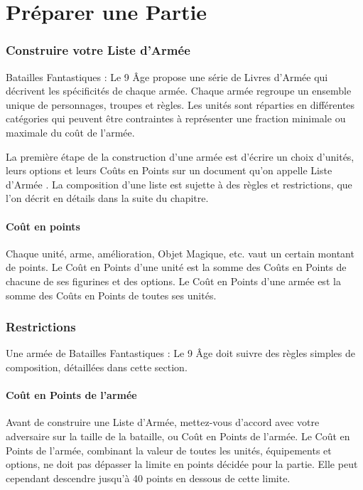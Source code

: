 
\part{Préparer une Partie}

\section{Construire votre Liste d'Armée}
\label{building_an_army}

Batailles Fantastiques : Le 9\ieme{} Âge propose une série de Livres d'Armée qui décrivent les spécificités de chaque armée. Chaque armée regroupe un ensemble unique de personnages, troupes et règles. Les unités sont réparties en différentes catégories qui peuvent être contraintes à représenter une fraction minimale ou maximale du coût de l'armée.

La première étape de la construction d'une armée est d'écrire un choix d'unités, leurs options et leurs Coûts en Points sur un document qu'on appelle \og Liste d'Armée \fg{}. La composition d'une liste est sujette à des règles et restrictions, que l'on décrit en détails dans la suite du chapitre.

\subsection{Coût en points}

Chaque unité, arme, amélioration, Objet Magique, etc. vaut un certain montant de points. Le Coût en Points d'une unité est la somme des Coûts en Points de chacune de ses figurines et des options. Le Coût en Points d'une armée est la somme des Coûts en Points de toutes ses unités.


\newpage
\section{Restrictions}

Une armée de Batailles Fantastiques : Le 9\ieme{} Âge doit suivre des règles simples de composition, détaillées dans cette section.

\subsection{Coût en Points de l'armée}

Avant de construire une Liste d'Armée, mettez-vous d'accord avec votre adversaire sur la taille de la bataille, ou Coût en Points de l'armée. Le Coût en Points de l'armée, combinant la valeur de toutes les unités, équipements et options, ne doit pas dépasser la limite en points décidée pour la partie. Elle peut cependant descendre jusqu'à 40 points en dessous de cette limite.

